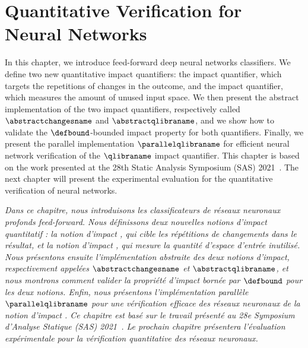 \setchapterpreamble[u]{\margintoc}


\chapter{Quantitative Verification for Neural Networks}

In this chapter, we introduce feed-forward deep neural networks classifiers.
We define two new quantitative impact quantifiers: the \changesname{} impact quantifier, which targets the repetitions of changes in the outcome, and the \qlibraname{} impact quantifier, which measures the amount of unused input space. We then present the abstract implementation of the two impact quantifiers, respectively called $\abstractchangesname$ and $\abstractqlibraname$, and we show how to validate the $\defbound$-bounded impact property for both quantifiers. Finally, we present the parallel implementation $\parallelqlibraname$ for efficient neural network verification of the $\qlibraname$ impact quantifier.
This chapter is based on the work presented at the 28th Static Analysis Symposium (SAS) 2021~\cite{Mazzucato2021}.
The next chapter will present the experimental evaluation for the quantitative verification of neural networks.


\frenchdiv

\emph{Dans ce chapitre, nous introduisons les classificateurs de réseaux neuronaux profonds feed-forward. Nous définissons deux nouvelles notions d'impact quantitatif : la notion d'impact \changesname{}, qui cible les répétitions de changements dans le résultat, et la notion d'impact \qlibraname{}, qui mesure la quantité d'espace d'entrée inutilisé. Nous présentons ensuite l'implémentation abstraite des deux notions d'impact, respectivement appelées $\abstractchangesname$ et $\abstractqlibraname$, et nous montrons comment valider la propriété d'impact bornée par $\defbound$ pour les deux notions. Enfin, nous présentons l'implémentation parallèle $\parallelqlibraname$ pour une vérification efficace des réseaux neuronaux de la notion d'impact \qlibraname{}. Ce chapitre est basé sur le travail présenté au 28e Symposium d'Analyse Statique (SAS) 2021~. Le prochain chapitre présentera l'évaluation expérimentale pour la vérification quantitative des réseaux neuronaux.}

% 
% 
% 
% 
% 

